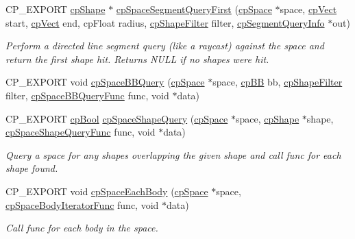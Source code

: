 \begin{DoxyCompactItemize}
C\+P\+\_\+\+E\+X\+P\+O\+RT \hyperlink{structcpShape}{cp\+Shape} $\ast$ \hyperlink{group__cpSpace_ga3e5e74241b96f6feff02476030007e68}{cp\+Space\+Segment\+Query\+First} (\hyperlink{structcpSpace}{cp\+Space} $\ast$space, \hyperlink{structcpVect}{cp\+Vect} start, \hyperlink{structcpVect}{cp\+Vect} end, cp\+Float radius, \hyperlink{structcpShapeFilter}{cp\+Shape\+Filter} filter, \hyperlink{structcpSegmentQueryInfo}{cp\+Segment\+Query\+Info} $\ast$out)
\begin{DoxyCompactList}\small\item\em Perform a directed line segment query (like a raycast) against the space and return the first shape hit. Returns N\+U\+LL if no shapes were hit. \end{DoxyCompactList}\item 
C\+P\+\_\+\+E\+X\+P\+O\+RT void \hyperlink{group__cpSpace_ga09e4737a3b33755ee20066297138b64e}{cp\+Space\+B\+B\+Query} (\hyperlink{structcpSpace}{cp\+Space} $\ast$space, \hyperlink{structcpBB}{cp\+BB} bb, \hyperlink{structcpShapeFilter}{cp\+Shape\+Filter} filter, \hyperlink{group__cpSpace_ga02779238e9b8c07797aae6139fad203c}{cp\+Space\+B\+B\+Query\+Func} func, void $\ast$data)
\item 
\mbox{\label{group__cpSpace_ga8a87a09145f33a72404c77cce54e4778}} 
C\+P\+\_\+\+E\+X\+P\+O\+RT \hyperlink{group__basicTypes_gabc5e752c48f3449ca26ef413ecbd647e}{cp\+Bool} \hyperlink{group__cpSpace_ga8a87a09145f33a72404c77cce54e4778}{cp\+Space\+Shape\+Query} (\hyperlink{structcpSpace}{cp\+Space} $\ast$space, \hyperlink{structcpShape}{cp\+Shape} $\ast$shape, \hyperlink{group__cpSpace_gab124952dd71dea36688f6ff6ff8bdcb2}{cp\+Space\+Shape\+Query\+Func} func, void $\ast$data)
\begin{DoxyCompactList}\small\item\em Query a space for any shapes overlapping the given shape and call {\ttfamily func} for each shape found. \end{DoxyCompactList}\item 
\mbox{\label{group__cpSpace_ga8119f11a4c6a44d82fb15a5873c42607}} 
C\+P\+\_\+\+E\+X\+P\+O\+RT void \hyperlink{group__cpSpace_ga8119f11a4c6a44d82fb15a5873c42607}{cp\+Space\+Each\+Body} (\hyperlink{structcpSpace}{cp\+Space} $\ast$space, \hyperlink{group__cpSpace_ga2870b1128c5bfe79cb261d269abdea64}{cp\+Space\+Body\+Iterator\+Func} func, void $\ast$data)
\begin{DoxyCompactList}\small\item\em Call {\ttfamily func} for each body in the space. \end{DoxyCompactList}\item 

\end{DoxyCompactItemize}
